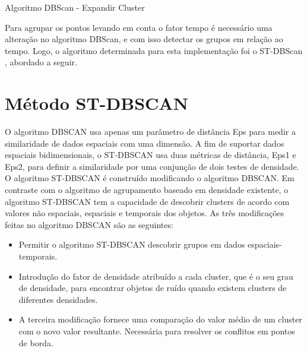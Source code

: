 \begin{algorithm}[h!]
	\SetSpacedAlgorithm
	\caption{\label{alg:algoritmo_dbscan_exp}Algoritmo DBScan - Expandir Cluster}
\end{algorithm}

Para agrupar os pontos levando em conta o fator tempo é necessário uma alteração no algoritmo DBScan, e com isso detectar os grupos em relação ao tempo. Logo, o algoritmo determinada para esta implementação foi o ST-DBScan \cite{Birant2007STDBSCANAA}, abordado a seguir.

\section{Método ST-DBSCAN}
\label{stdbscan}

O algoritmo DBSCAN \cite{ESTER1998} usa apenas um parâmetro de distância Eps para medir a similaridade de dados espaciais com uma dimensão. A fim de suportar dados espaciais bidimensionais, o ST-DBSCAN \cite{Birant2007STDBSCANAA} usa duas métricas de distância, Eps1 e Eps2, para definir a similaridade por uma conjunção de dois testes de densidade.
O algoritmo ST-DBSCAN é construído modificando o algoritmo DBSCAN. Em contraste com o algoritmo de agrupamento baseado em densidade existente, o algoritmo ST-DBSCAN tem a capacidade de descobrir clusters de acordo com valores não espaciais, espaciais e temporais dos objetos. As três modificações feitas no algoritmo DBSCAN são as seguintes:
\begin{itemize}
\item Permitir o algoritmo ST-DBSCAN descobrir grupos em dados espaciais-temporais.
\item Introdução do fator de densidade atribuído a cada cluster, que é o seu grau de densidade,
para encontrar objetos de ruído quando existem clusters de diferentes densidades.
\item A terceira modificação fornece uma comparação do valor médio de um cluster com o novo valor resultante. Necessária para resolver os conflitos em pontos de borda.
\end{itemize}

